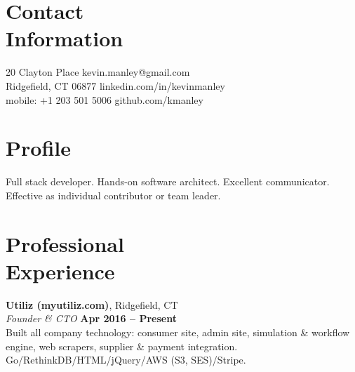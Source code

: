 \documentclass[margin,line]{resume}
\begin{document}
\begin{resume}

    \section{\mysidestyle Contact\\Information}

    20 Clayton Place			                            \hfill kevin.manley@gmail.com       \vspace{0mm}\\\vspace{0mm}%
    Ridgefield, CT 06877                                    \hfill linkedin.com/in/kevinmanley        \vspace{0mm}\\\vspace{0mm}%
    mobile: +1 203 501 5006 					\hfill github.com/kmanley  \vspace{0mm}\\\vspace{-4.5mm}%


    \section{\mysidestyle Profile}

    Full stack developer. Hands-on software architect. Excellent communicator. Effective as individual contributor or team leader.
    
    \section{\mysidestyle Professional\\Experience}

    \textbf{Utiliz (myutiliz.com)}, Ridgefield, CT\\
    \textsl{Founder \& CTO} \hfill \textbf{Apr 2016 -- Present}\\
    Built all company technology: consumer site, admin site, simulation \& workflow engine, web scrapers, supplier \& payment integration.
    Go/RethinkDB/HTML/jQuery/AWS (S3, SES)/Stripe.


\end{resume}
\end{document}
